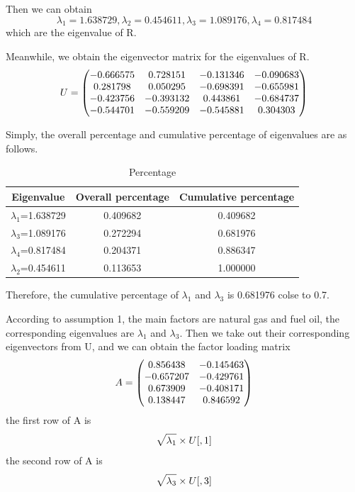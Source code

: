 \documentclass[a4paper,11pt]{article}
\begin{document}
\par Then we can obtain 
\[
\lambda_1=1.638729, \lambda_2=0.454611, \lambda_3=1.089176, \lambda_4=0.817484
\]
which are the eigenvalue of R.
\par Meanwhile, we obtain the eigenvector matrix for the eigenvalues of R.
\begin{equation}
    \centering
U=\begin{pmatrix} -0.666575 & 0.728151 & -0.131346 & -0.090683 \\ 0.281798 & 0.050295 & -0.698391 & -0.655981 \\ -0.423756 & -0.393132 & 0.443861 & -0.684737 \\ -0.544701 & -0.559209 & -0.545881 & 0.304303\end{pmatrix}
\end{equation}
\par Simply, the overall percentage and cumulative percentage of eigenvalues are as follows.
\begin{table}[!hbp]
    \centering 
    \begin{tabular}{|c|c|c|}
\hline
Eigenvalue & Overall percentage & Cumulative percentage \\
\hline
$\lambda_1$=1.638729 & 0.409682 & 0.409682 \\
\hline
$\lambda_3$=1.089176 & 0.272294 & 0.681976 \\
\hline
$\lambda_4$=0.817484 & 0.204371 & 0.886347 \\
\hline
$\lambda_2$=0.454611 & 0.113653 & 1.000000 \\
\hline
\end{tabular}
\caption{Percentage}
\end{table}
\par Therefore, the cumulative percentage of $\lambda_1$ and $\lambda_3$ is 0.681976 colse to 0.7.
\par According to assumption 1, the main factors are natural gas and fuel oil, the corresponding eigenvalues are $\lambda_1$ and $\lambda_3$. Then we take out their corresponding eigenvectors from U, and we can obtain the factor loading matrix
\begin{equation}
    \centering
A=\begin{pmatrix} 0.856438 & -0.145463 \\ -0.657207 & -0.429761 \\ 0.673909 & -0.408171 \\ 0.138447 & 0.846592\end{pmatrix}
\end{equation}
the first row of A is
\begin{equation}
    \centering
\sqrt{\lambda_1} \times U[ ,1]
\end{equation}
the second row of A is
\begin{equation}
    \centering
\sqrt{\lambda_3} \times U[ ,3]
\end{equation}
\end{document}
